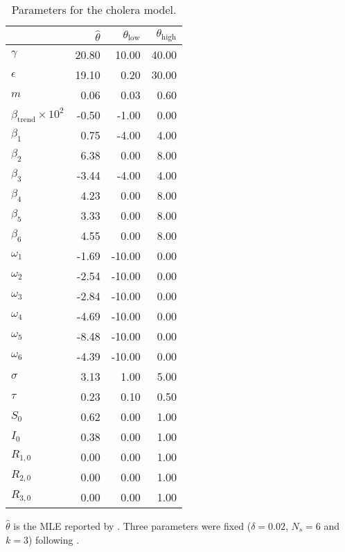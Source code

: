 \documentclass[11pt]{article}
\begin{document}
\begin{table}
\begin{center}
\caption{Parameters for the cholera model. 
}\label{tab:chol-params}
\begin{tabular}{lrrr}
  \hline
 & \rule[-1.5mm]{0mm}{7mm}\hspace{8mm}$\hat\theta$
 & \hspace{14mm}$\theta_{\mathrm{low}}$ & \hspace{10mm} $\theta_{\mathrm{high}}$ \\ 
  \hline
$\gamma$ & 20.80 & 10.00 & 40.00 \\ 
  $\epsilon$ & 19.10 & 0.20 & 30.00 \\ 
  $m$ & 0.06 & 0.03 & 0.60 \\ 
  $\beta_{\mathrm{trend}}\times 10^2$ & -0.50 & -1.00 & 0.00 \\ 
  $\beta_1$ & 0.75 & -4.00 & 4.00 \\ 
  $\beta_2$ & 6.38 & 0.00 & 8.00 \\ 
  $\beta_3$ & -3.44 & -4.00 & 4.00 \\ 
  $\beta_4$ & 4.23 & 0.00 & 8.00 \\ 
  $\beta_5$ & 3.33 & 0.00 & 8.00 \\ 
  $\beta_6$ & 4.55 & 0.00 & 8.00 \\ 
  $\omega_1$ & -1.69 & -10.00 & 0.00 \\ 
  $\omega_2$ & -2.54 & -10.00 & 0.00 \\ 
  $\omega_3$ & -2.84 & -10.00 & 0.00 \\ 
  $\omega_4$ & -4.69 & -10.00 & 0.00 \\ 
  $\omega_5$ & -8.48 & -10.00 & 0.00 \\ 
  $\omega_6$ & -4.39 & -10.00 & 0.00 \\ 
  $\sigma$ & 3.13 & 1.00 & 5.00 \\ 
  $\tau$ & 0.23 & 0.10 & 0.50 \\ 
  $S_0$ & 0.62 & 0.00 & 1.00 \\ 
  $I_0$ & 0.38 & 0.00 & 1.00 \\ 
  $R_{1,0}$ & 0.00 & 0.00 & 1.00 \\ 
  $R_{2,0}$ & 0.00 & 0.00 & 1.00 \\ 
  $R_{3,0}$ & 0.00 & 0.00 & 1.00 \\ 
   \hline
\end{tabular}
\parbox{8cm}{\small
{$\hat\theta$ is the MLE reported by \cite{king08}.
Three parameters were fixed ($\delta=0.02$, $N_s=6$ and $k=3$) following \cite{king08}. 
}}
\end{center}
\end{table}
\end{document}
